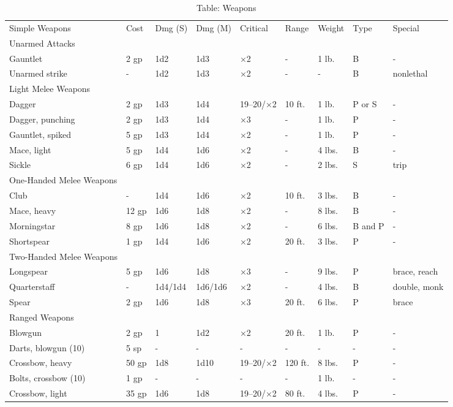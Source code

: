 		
\begin{table}[]
\sffamily
\caption{Table: Weapons}
\begin{tabular}{lllllllll}
Simple Weapons & Cost & Dmg (S) & Dmg (M) & Critical & Range & Weight &  Type & Special\\
Unarmed Attacks \\
 Gauntlet & 2 gp & 1d2 & 1d3 & ×2 & - & 1 lb. & B & - \\
 Unarmed strike & - & 1d2 & 1d3 & ×2 & - & - & B & nonlethal \\
 Light Melee Weapons \\
 Dagger & 2 gp & 1d3 & 1d4 & 19–20/×2 & 10 ft. & 1 lb. & P or S & - \\
 Dagger, punching & 2 gp & 1d3 & 1d4  & ×3 & - & 1 lb. & P & - \\
 Gauntlet, spiked & 5 gp & 1d3 & 1d4 & ×2 & - & 1 lb. & P & - \\
 Mace, light & 5 gp & 1d4 & 1d6 & ×2 & - & 4 lbs. & B & - \\
 Sickle & 6 gp & 1d4 & 1d6 & ×2 & - & 2 lbs. & S & trip \\
 One-Handed Melee Weapons \\
 Club & - & 1d4 & 1d6 & ×2 & 10 ft. & 3 lbs. & B & - \\
 Mace, heavy & 12 gp & 1d6 & 1d8 & ×2 & - & 8 lbs. & B & - \\
 Morningstar & 8 gp & 1d6 & 1d8 & ×2 & - & 6 lbs. & B and P & - \\
 Shortspear & 1 gp & 1d4 & 1d6 & ×2 & 20 ft. & 3 lbs. & P & - \\
 Two-Handed Melee Weapons \\
 Longspear & 5 gp & 1d6 & 1d8 & ×3 & - & 9 lbs. & P & brace, reach \\
 Quarterstaff & - & 1d4/1d4 & 1d6/1d6 & ×2 & - & 4 lbs. & B & double, monk \\
 Spear & 2 gp & 1d6 & 1d8 & ×3 & 20 ft. & 6 lbs. & P & brace \\
 Ranged Weapons \\
 Blowgun & 2 gp & 1 & 1d2 & ×2 & 20 ft. & 1 lb. & P & - \\
 Darts, blowgun (10) & 5 sp & - & - & - & - & - & - & - \\
 Crossbow, heavy & 50 gp & 1d8 & 1d10 & 19–20/×2 & 120 ft. & 8 lbs. & P & - \\
 Bolts, crossbow (10) & 1 gp & - & - & - & - & 1 lb. & - & - \\
 Crossbow, light & 35 gp & 1d6 & 1d8 & 19–20/×2 & 80 ft. & 4 lbs. & P & - \\

\end{tabular}
\end{table}
